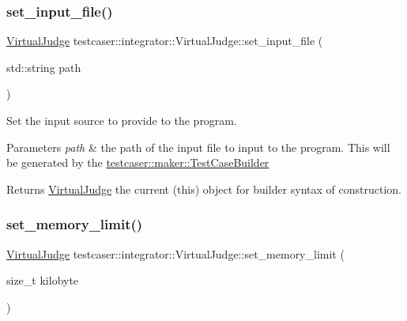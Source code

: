 \subsubsection{\texorpdfstring{set\_input\_file()}{set\_input\_file()}}
{\footnotesize\ttfamily \mbox{\hyperlink{classtestcaser_1_1integrator_1_1VirtualJudge}{Virtual\+Judge}} testcaser\+::integrator\+::\+Virtual\+Judge\+::set\+\_\+input\+\_\+file (\begin{DoxyParamCaption}\item[{std\+::string}]{path }\end{DoxyParamCaption})\hspace{0.3cm}{\ttfamily [inline]}}



Set the input source to provide to the program. 


\begin{DoxyParams}{Parameters}
{\em path} & the path of the input file to input to the program. This will be generated by the \mbox{\hyperlink{classtestcaser_1_1maker_1_1TestCaseBuilder}{testcaser\+::maker\+::\+Test\+Case\+Builder}} \\
\hline
\end{DoxyParams}
\begin{DoxyReturn}{Returns}
\mbox{\hyperlink{classtestcaser_1_1integrator_1_1VirtualJudge}{Virtual\+Judge}} the current (this) object for builder syntax of construction. 
\end{DoxyReturn}
\mbox{\label{classtestcaser_1_1integrator_1_1VirtualJudge_a8ac8e323d9f69fb4e1f6ee2e9aa1ae9f}} 
\subsubsection{\texorpdfstring{set\_memory\_limit()}{set\_memory\_limit()}}
{\footnotesize\ttfamily \mbox{\hyperlink{classtestcaser_1_1integrator_1_1VirtualJudge}{Virtual\+Judge}} testcaser\+::integrator\+::\+Virtual\+Judge\+::set\+\_\+memory\+\_\+limit (\begin{DoxyParamCaption}\item[{size\+\_\+t}]{kilobyte }\end{DoxyParamCaption})\hspace{0.3cm}{\ttfamily [inline]}}



